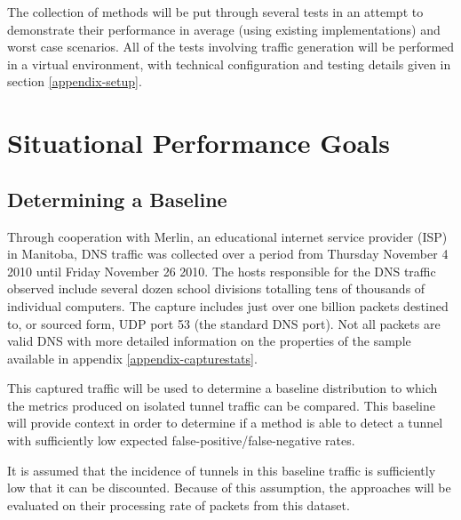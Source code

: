 \documentclass[12pt]{report}
\theoremstyle{remark}
\theoremstyle{definition}
\theoremstyle{definition}
\theoremstyle{definition}
\begin{document}
The collection of methods will be put through several tests in an attempt to
demonstrate their performance in average (using existing implementations) and
worst case scenarios. All of the tests involving traffic generation will be
performed in a virtual environment, with technical configuration and testing
details given in section \ref{appendix-setup}.

\section{Situational Performance Goals}
\subsection{Determining a Baseline}
\label{baseline}
Through cooperation with Merlin, an educational internet service provider (ISP)
in Manitoba, DNS traffic was collected over a period from Thursday November 4
2010 until Friday November 26 2010. The hosts responsible for the DNS traffic
observed include several dozen school divisions totalling tens of thousands of
individual computers. The capture includes just over one billion packets
destined to, or sourced form, UDP port 53 (the standard DNS port). Not all
packets are valid DNS with more detailed information on the properties of the
sample available in appendix \ref{appendix-capturestats}.

This captured traffic will be used to determine a baseline distribution to which
the metrics produced on isolated tunnel traffic can be compared. This baseline
will provide context in order to determine if a method is able to detect a
tunnel with sufficiently low expected false-positive/false-negative rates.

It is assumed that the incidence of tunnels in this baseline traffic is
sufficiently low that it can be discounted. Because of this assumption, the
approaches will be evaluated on their processing rate of packets from this
dataset.

\end{document}
